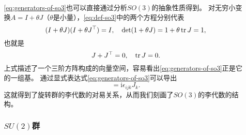 \documentclass[hyperref, UTF8, a4paper]{ctexart}
\newcommand*{\ii}{\mathrm{i}}
\begin{document}
\eqref{eq:generators-of-so3}也可以直接通过分析$SO(3)$的抽象性质得到。
对无穷小变换$A = I + \theta J$（$\theta$是小量），\eqref{eq:def-so3}中的两个方程分别代表
\[
    (I+\theta J) (I + \theta J^\top) = I, \quad \det (1 + \theta J) = 1 + \theta \trace J = 1,
\]
也就是
\[
    J + J^\top = 0, \quad \trace J = 0.
\]
上式描述了一个三阶方阵构成的向量空间，容易看出\eqref{eq:generators-of-so3}正是它的一组基。
通过显式表达式\eqref{eq:generators-of-so3}可以导出
\begin{equation}
    [J_i, J_j] = \ii \epsilon_{ijk} J_k.
    \label{eq:lie-algebra-so3}
\end{equation}
这就得到了旋转群的李代数的对易关系，从而我们刻画了$SO(3)$的李代数的结构。

\subsubsection{$SU(2)$群}
\end{document}
